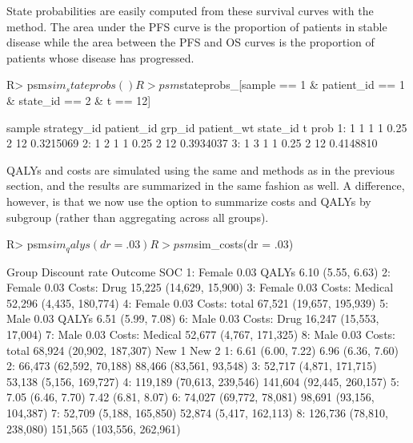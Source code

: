 \documentclass[article, nojss]{jss}\usepackage[]{graphicx}\usepackage[]{color}
\begin{document}
State probabilities are easily computed from these survival curves with the  method. The area under the PFS curve is the proportion of patients in stable disease while the area between the PFS and OS curves is the proportion of patients whose disease has progressed.

\begin{Schunk}
\begin{Sinput}
R> psm$sim_stateprobs()
R> psm$stateprobs_[sample == 1 & patient_id == 1 & state_id == 2 & t == 12]
\end{Sinput}
\begin{Soutput}
   sample strategy_id patient_id grp_id patient_wt state_id  t      prob
1:      1           1          1      1       0.25        2 12 0.3215069
2:      1           2          1      1       0.25        2 12 0.3934037
3:      1           3          1      1       0.25        2 12 0.4148810
\end{Soutput}
\end{Schunk}

QALYs and costs are simulated using the same  and  methods as in the previous section, and the results are summarized in the same fashion as well. A difference, however, is that we now use the  option to summarize costs and QALYs by subgroup (rather than aggregating across all groups). 

\begin{Schunk}
\begin{Sinput}
R> psm$sim_qalys(dr = .03) 
R> psm$sim_costs(dr = .03)
\end{Sinput}
\end{Schunk}

\begin{Schunk}
\begin{Soutput}
    Group Discount rate        Outcome                      SOC
1: Female          0.03          QALYs        6.10 (5.55, 6.63)
2: Female          0.03    Costs: Drug  15,225 (14,629, 15,900)
3: Female          0.03 Costs: Medical  52,296 (4,435, 180,774)
4: Female          0.03   Costs: total 67,521 (19,657, 195,939)
5:   Male          0.03          QALYs        6.51 (5.99, 7.08)
6:   Male          0.03    Costs: Drug  16,247 (15,553, 17,004)
7:   Male          0.03 Costs: Medical  52,677 (4,767, 171,325)
8:   Male          0.03   Costs: total 68,924 (20,902, 187,307)
                       New 1                      New 2
1:         6.61 (6.00, 7.22)          6.96 (6.36, 7.60)
2:   66,473 (62,592, 70,188)    88,466 (83,561, 93,548)
3:   52,717 (4,871, 171,715)    53,138 (5,156, 169,727)
4: 119,189 (70,613, 239,546)  141,604 (92,445, 260,157)
5:         7.05 (6.46, 7.70)          7.42 (6.81, 8.07)
6:   74,027 (69,772, 78,081)   98,691 (93,156, 104,387)
7:   52,709 (5,188, 165,850)    52,874 (5,417, 162,113)
8: 126,736 (78,810, 238,080) 151,565 (103,556, 262,961)
\end{Soutput}
\end{Schunk}
\end{document}
